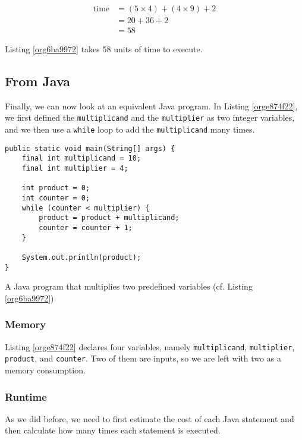 \documentclass[11pt]{article}
\begin{document}
\begin{align*}
 \text{time} &= (5 \times 4) + (4 \times 9) + 2 \\
             &= 20 + 36 + 2 \\
             &= 58
\end{align*}

Listing \ref{org6ba9972} takes 58 units of time to execute.

\subsection{From Java}
\label{sec:org700d220}

Finally, we can now look at an equivalent Java program. In Listing
\ref{orge874f22}, we first defined the \texttt{multiplicand} and the
\texttt{multiplier} as two integer variables, and we then use a \texttt{while} loop
to add the \texttt{multiplicand} many times.

\begin{listing}[htbp]
\begin{verbatim}
public static void main(String[] args) {
    final int multiplicand = 10;
    final int multiplier = 4;

    int product = 0;
    int counter = 0;
    while (counter < multiplier) {
        product = product + multiplicand;
        counter = counter + 1;
    }

    System.out.println(product);
}
\end{verbatim}
\caption{\label{orge874f22}A Java program that multiplies two predefined variables (cf. Listing \ref{org6ba9972})}
\end{listing}

\subsubsection*{Memory}
\label{sec:org96cd4c8}

Listing \ref{orge874f22} declares four variables, namely
\texttt{multiplicand}, \texttt{multiplier}, \texttt{product}, and \texttt{counter}. Two of them
are inputs, so we are left with two as a memory consumption.

\subsubsection*{Runtime}
\label{sec:org3a6c6a6}

As we did before, we need to first estimate the cost of each Java
statement and then calculate how many times each statement is
executed.
\end{document}
